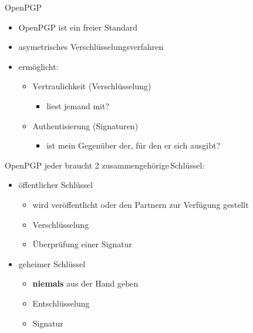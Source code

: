 \begin{frame}{OpenPGP}
  \begin{itemize}
    \item OpenPGP ist ein freier Standard
    \item asymetrisches Verschlüsselungsverfahren
    \item ermöglicht:
      \begin{itemize}
	\item Vertraulichkeit (Verschlüsselung)
	  \begin{itemize}
	    \item liest jemand mit?
	  \end{itemize}
	\item Authentisierung (Signaturen)
	  \begin{itemize}
	    \item ist mein Gegenüber der, für den er sich ausgibt?
	  \end{itemize}
      \end{itemize}
  \end{itemize}

\end{frame}

\begin{frame}{OpenPGP}
  jeder braucht 2 zusammengehörige Schlüssel:
  \begin{itemize}
    \item öffentlicher Schlüssel
      \begin{itemize}
	\item wird veröffentlicht oder den Partnern zur Verfügung gestellt
	\item Verschlüsselung
	\item Überprüfung einer Signatur
      \end{itemize}
    \item geheimer Schlüssel
      \begin{itemize}
	\item \textbf{niemals} aus der Hand geben
	\item Entschlüsselung
	\item Signatur
      \end{itemize}
  \end{itemize}

\end{frame}

